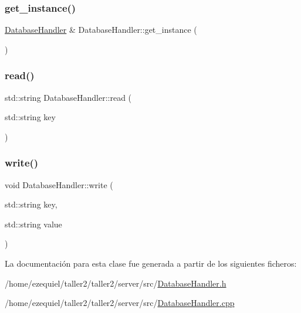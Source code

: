 \mbox{\label{classDatabaseHandler_a76199057f644c31cb310b09f65919288}} 
\subsubsection{\texorpdfstring{get\+\_\+instance()}{get\_instance()}}
{\footnotesize\ttfamily \hyperlink{classDatabaseHandler}{Database\+Handler} \& Database\+Handler\+::get\+\_\+instance (\begin{DoxyParamCaption}{ }\end{DoxyParamCaption})\hspace{0.3cm}{\ttfamily [static]}}

\mbox{\label{classDatabaseHandler_aa63e4f240a1525666ea768aee69a2001}} 
\subsubsection{\texorpdfstring{read()}{read()}}
{\footnotesize\ttfamily std\+::string Database\+Handler\+::read (\begin{DoxyParamCaption}\item[{std\+::string}]{key }\end{DoxyParamCaption})}

\mbox{\label{classDatabaseHandler_a45bea506977bb1f4ab02838fbde27d45}} 
\subsubsection{\texorpdfstring{write()}{write()}}
{\footnotesize\ttfamily void Database\+Handler\+::write (\begin{DoxyParamCaption}\item[{std\+::string}]{key,  }\item[{std\+::string}]{value }\end{DoxyParamCaption})}



La documentación para esta clase fue generada a partir de los siguientes ficheros\+:\begin{DoxyCompactItemize}
\item 
/home/ezequiel/taller2/taller2/server/src/\hyperlink{DatabaseHandler_8h}{Database\+Handler.\+h}\item 
/home/ezequiel/taller2/taller2/server/src/\hyperlink{DatabaseHandler_8cpp}{Database\+Handler.\+cpp}\end{DoxyCompactItemize}
